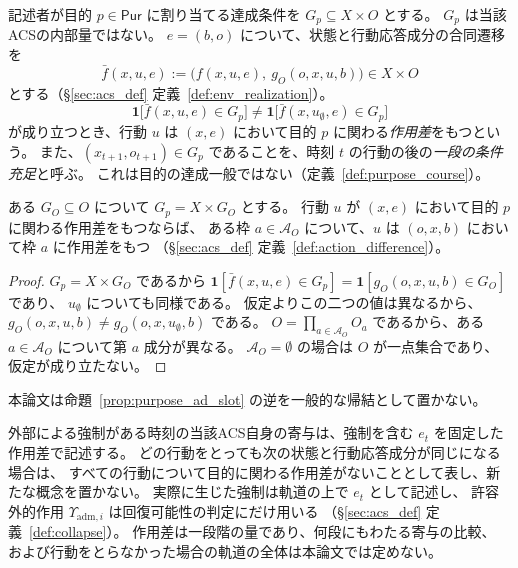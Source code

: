 \begin{definition}
\label{def:purpose_action_difference}
記述者が目的 $p\in\mathsf{Pur}$ に割り当てる達成条件を $G_p\subseteq X\times O$ とする。
$G_p$ は当該ACSの内部量ではない。
$e=(b,o)$ について、状態と行動応答成分の合同遷移を
\[
  \bar f(x,u,e):=\bigl(f(x,u,e),\ g_O(o,x,u,b)\bigr)\in X\times O
\]
とする（\S\ref{sec:acs_def} 定義~\ref{def:env_realization}）。
\[
  \mathbf 1\bigl[\bar f(x,u,e)\in G_p\bigr]
  \neq
  \mathbf 1\bigl[\bar f(x,u_{\emptyset},e)\in G_p\bigr]
\]
が成り立つとき、行動 $u$ は $(x,e)$ において目的 $p$ に関わる\emph{作用差}をもつという。
また、$(x_{t+1},o_{t+1})\in G_p$ であることを、時刻 $t$ の行動の後の\emph{一段の条件充足}と呼ぶ。
これは目的の達成一般ではない（定義~\ref{def:purpose_course}）。
\end{definition}

\begin{proposition}[外部側の区分と枠の作用差]
\label{prop:purpose_ad_slot}
ある $G_O\subseteq O$ について $G_p=X\times G_O$ とする。
行動 $u$ が $(x,e)$ において目的 $p$ に関わる作用差をもつならば、
ある枠 $a\in\mathcal A_O$ について、$u$ は $(o,x,b)$ において枠 $a$ に作用差をもつ
（\S\ref{sec:acs_def} 定義~\ref{def:action_difference}）。
\end{proposition}

\begin{proof}
$G_p=X\times G_O$ であるから
$\mathbf 1[\bar f(x,u,e)\in G_p]=\mathbf 1[g_O(o,x,u,b)\in G_O]$ であり、
$u_{\emptyset}$ についても同様である。
仮定よりこの二つの値は異なるから、$g_O(o,x,u,b)\neq g_O(o,x,u_{\emptyset},b)$ である。
$O=\prod_{a\in\mathcal A_O}O_a$ であるから、ある $a\in\mathcal A_O$ について第 $a$ 成分が異なる。
$\mathcal A_O=\emptyset$ の場合は $O$ が一点集合であり、仮定が成り立たない。
\end{proof}

本論文は命題~\ref{prop:purpose_ad_slot} の逆を一般的な帰結として置かない。

\begin{remark}[外部による強制と作用差]
\label{rem:forcing_action_difference}
外部による強制がある時刻の当該ACS自身の寄与は、強制を含む $e_t$ を固定した作用差で記述する。
どの行動をとっても次の状態と行動応答成分が同じになる場合は、
すべての行動について目的に関わる作用差がないこととして表し、新たな概念を置かない。
実際に生じた強制は軌道の上で $e_t$ として記述し、
許容外的作用 $\Upsilon_{\mathrm{adm},i}$ は回復可能性の判定にだけ用いる
（\S\ref{sec:acs_def} 定義~\ref{def:collapse}）。
作用差は一段階の量であり、何段にもわたる寄与の比較、
および行動をとらなかった場合の軌道の全体は本論文では定めない。
\end{remark}

